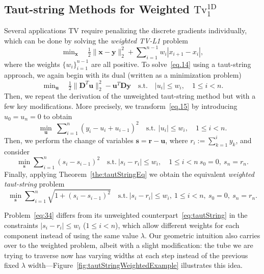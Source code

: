 \documentclass[twoside,11pt]{article}
\newcommand{\vr}{\bm{r}}       \newcommand{\vrh}{\hat{\bm{r}}}        \newcommand{\rh}{\hat{r}}    \newcommand{\vrt}{\tilde{\bm{r}}}       \newcommand{\rt}{\tilde{r}}
\newcommand{\vs}{\bm{s}}       \newcommand{\vsh}{\hat{\bm{s}}}        \newcommand{\sh}{\hat{s}}    \newcommand{\vst}{\tilde{\bm{s}}}       \newcommand{\st}{\tilde{s}}
\newcommand{\vu}{\bm{u}}       \newcommand{\vuh}{\hat{\bm{u}}}        \newcommand{\uh}{\hat{u}}    \newcommand{\vut}{\tilde{\bm{u}}}       \newcommand{\ut}{\tilde{u}}
\newcommand{\vx}{\bm{x}}       \newcommand{\vxh}{\hat{\bm{x}}}        \newcommand{\xh}{\hat{x}}    \newcommand{\vxt}{\tilde{\bm{x}}}       \newcommand{\xt}{\tilde{x}}
\newcommand{\vy}{\bm{y}}       \newcommand{\vyh}{\hat{\bm{y}}}        \newcommand{\yh}{\hat{y}}    \newcommand{\vyt}{\tilde{\bm{y}}}       \newcommand{\yt}{\tilde{y}}
\newcommand{\md}{\bm{D}}
\newcommand{\mynorm}[2]{\| {#1} \|_{#2}}
\newcommand{\enorm}[1]{\mynorm{#1}{2}}
\newcommand{\nlsum}{\sum\nolimits}
\newcommand{\nlmin}{\min\nolimits}
\newcommand{\half}{\tfrac{1}{2}}
\newcommand{\tvell}{\text{Tv}}
\newcommand{\oned}{\text{1D}}
\numberwithin{equation}{section}
\numberwithin{theorem}{section}
\begin{document}
\subsection{Taut-string Methods for Weighted $\tvell_1^{\oned}$}
\label{sec:tautweighted}
Several applications TV require penalizing the discrete gradients individually, which can be done by solving the \emph{weighted TV-L1} problem
\begin{equation}
  \label{eq.14}
  \nlmin_{\vx}\quad\half\enorm{\vx-\vy}^2 + \nlsum_{i=1}^{n-1} w_i|x_{i+1}-x_i|,
\end{equation}
where the weights $\{w_i\}_{i=1}^{n-1}$ are all positive. To solve~\eqref{eq.14} using a taut-string approach, we again begin with its dual (written as a minimization problem)
\begin{equation}
  \label{eq.15}
  \nlmin_{\vu}\quad\half\enorm{\md^T\vu}^2 - \vu^T\bm{Dy}\quad\text{s.t.}\quad |u_i| \le w_i,\quad 1 \le i < n.
\end{equation}
Then, we repeat the derivation of the unweighted taut-string method but with a few key modifications. More precisely, we transform~\eqref{eq.15} by introducing $u_0 = u_n = 0$ to obtain
\begin{equation*}
 \min_{\vu}\ \nlsum_{i=1}^n \left(y_i - u_i + u_{i-1} \right)^2 \quad \text{s.t.}\  \, |u_i| \le w_i,\quad 1 \le i < n.
\end{equation*}
Then, we perform the change of variables $\vs = \vr - \vu$, where $r_i := \sum_{k=1}^i y_k$, and consider
\begin{equation*}
 \min_{\vs} \nlsum_{i=1}^n \left(s_i - s_{i-1} \right)^2 \quad \text{s.t.}\  |s_i - r_i| \le w_i,\quad 1 \le i < n\ s_0 = 0,\ s_n = r_n.
\end{equation*}
Finally, applying Theorem~\ref{the:tautStringEq} we obtain the equivalent \emph{weighted taut-string} problem
\begin{equation}
  \label{eq:34}
 \min_{\vs} \nlsum_{i=1}^n \sqrt{1 + \left(s_i - s_{i-1} \right)^2} \quad \text{s.t.}\ |s_i - r_i| \le w_i,\ 1\le i < n,\ s_0 = 0,\ s_n = r_n.
\end{equation}

Problem~\eqref{eq:34} differs from its unweighted counterpart~\eqref{eq:tautString} in the constraints $|s_i - r_i| \le w_i$ ($1\le i < n$), which allow different weights for each component instead of using the same value $\lambda$. Our geometric intuition also carries over to the weighted problem, albeit with a slight modification: the tube we are trying to traverse now has varying widths at each step instead of the previous fixed $\lambda$ width---Figure~\ref{fig:tautStringWeightedExample} illustrates this idea.
\end{document}
